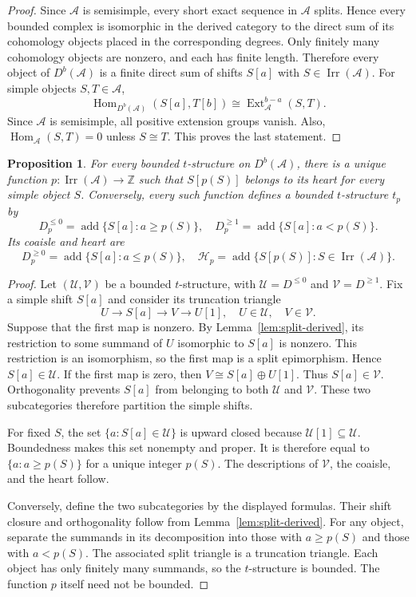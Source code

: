 \documentclass[11pt]{amsart}
\newcommand{\A}{\mathcal A}
\newcommand{\Hh}{\mathcal H}
\newcommand{\Irr}{\operatorname{Irr}}
\newcommand{\add}{\operatorname{add}}
\DeclareMathOperator{\Hom}{Hom}
\DeclareMathOperator{\Ext}{Ext}
\newtheorem{proposition}[theorem]{Proposition}
\theoremstyle{definition}
\theoremstyle{remark}
\theoremstyle{plain}
\begin{document}
\begin{proof}
Since $\A$ is semisimple, every short exact sequence in $\A$ splits. Hence every bounded complex is isomorphic in the derived category to the direct sum of its cohomology objects placed in the corresponding degrees. Only finitely many cohomology objects are nonzero, and each has finite length. Therefore every object of $D^b(\A)$ is a finite direct sum of shifts $S[a]$ with $S\in\Irr(\A)$. For simple objects $S,T\in\A$,
$$
\Hom_{D^b(\A)}(S[a],T[b])\cong \Ext_{\A}^{b-a}(S,T).
$$
Since $\A$ is semisimple, all positive extension groups vanish. Also, $\Hom_{\A}(S,T)=0$ unless $S\cong T$. This proves the last statement.
\end{proof}


\begin{proposition}\label{prop:semisimple-t}
For every bounded $t$-structure on $D^b(\A)$, there is a unique function $p:\Irr(\A)\to\mathbb Z$ such that $S[p(S)]$ belongs to its heart for every simple object $S$. Conversely, every such function defines a bounded $t$-structure $t_p$ by
\[
D_p^{\leq0}=\add\{S[a]:a\geq p(S)\},\quad D_p^{\geq1}=\add\{S[a]:a<p(S)\}.
\]
Its coaisle and heart are
\[
D_p^{\geq0}=\add\{S[a]:a\leq p(S)\},\quad \Hh_p=\add\{S[p(S)]:S\in\Irr(\A)\}.
\]
\end{proposition}

\begin{proof}
Let $(\mathcal U,\mathcal V)$ be a bounded $t$-structure, with $\mathcal U=D^{\leq0}$ and $\mathcal V=D^{\geq1}$. Fix a simple shift $S[a]$ and consider its truncation triangle
\[
U\rightarrow S[a]\rightarrow V\rightarrow U[1],\quad U\in\mathcal U,\quad V\in\mathcal V.
\]
Suppose that the first map is nonzero. By Lemma~\ref{lem:split-derived}, its restriction to some summand of $U$ isomorphic to $S[a]$ is nonzero. This restriction is an isomorphism, so the first map is a split epimorphism. Hence $S[a]\in\mathcal U$. If the first map is zero, then $V\cong S[a]\oplus U[1]$. Thus $S[a]\in\mathcal V$. Orthogonality prevents $S[a]$ from belonging to both $\mathcal U$ and $\mathcal V$. These two subcategories therefore partition the simple shifts.

For fixed $S$, the set $\{a:S[a]\in\mathcal U\}$ is upward closed because $\mathcal U[1]\subseteq\mathcal U$. Boundedness makes this set nonempty and proper. It is therefore equal to $\{a:a\geq p(S)\}$ for a unique integer $p(S)$. The descriptions of $\mathcal V$, the coaisle, and the heart follow.

Conversely, define the two subcategories by the displayed formulas. Their shift closure and orthogonality follow from Lemma~\ref{lem:split-derived}. For any object, separate the summands in its decomposition into those with $a\geq p(S)$ and those with $a<p(S)$. The associated split triangle is a truncation triangle. Each object has only finitely many summands, so the $t$-structure is bounded. The function $p$ itself need not be bounded.
\end{proof}
\end{document}
